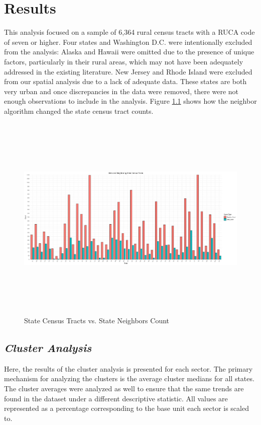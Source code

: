 \chapter{Results}	

This analysis focused on a sample of 6,364 rural census tracts with a RUCA code of seven or higher. Four states and Washington D.C. were intentionally excluded from the analysis: Alaska and Hawaii were omitted due to the presence of unique factors, particularly in their rural areas, which may not have been adequately addressed in the existing literature.  New Jersey and Rhode Island were excluded from our spatial analysis due to a lack of adequate data. These states are both very urban and once discrepancies in the data were removed, there were not enough observations to include in the analysis.  Figure \ref{fig:neighbors_bar} shows how the neighbor algorithm changed the state census tract counts. 

\begin{figure}[htbp]
    \centering
    \includegraphics[width=1\textwidth, height=10cm]{plots/neighbors.jpeg}
    \caption{State Census Tracts vs. State Neighbors Count}
    \label{fig:neighbors_bar}
\end{figure}


\section{\textit{Cluster Analysis}}

Here, the results of the cluster analysis is presented for each sector. The primary mechanism for analyzing the clusters is the average cluster medians for all states. The cluster averages were analyzed as well to ensure that the same trends are found in the dataset under a different descriptive statistic. All values are represented as a percentage corresponding to the base unit each sector is scaled to. 

